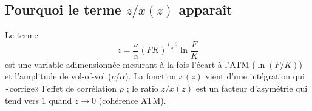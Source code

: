 \documentclass[11pt,a4paper]{report}
\theoremstyle{definition}
\theoremstyle{plain}
\theoremstyle{remark}
\newcommand{\1}{\mathbf{1}}
\newcommand{\filepath}[1]{\texttt{\detokenize{#1}}}
\newcommand{\codeid}[1]{\texttt{\detokenize{#1}}}
\begin{document}
\subsection*{Pourquoi le terme $z/x(z)$ apparaît}
Le terme
\[
z=\frac{\nu}{\alpha}(FK)^{\frac{1-\beta}{2}}\ln\frac{F}{K}
\]
est une variable adimensionnée mesurant à la fois l'écart à l'ATM ($\ln(F/K)$) et l'amplitude de vol-of-vol ($\nu/\alpha$).
La fonction $x(z)$ vient d'une intégration qui «corrige» l'effet de corrélation $\rho$ ; le ratio $z/x(z)$ est un facteur d'asymétrie qui tend vers 1 quand $z\to 0$ (cohérence ATM).

\end{document}
